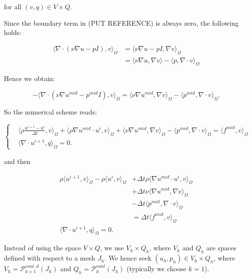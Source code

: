 \documentclass[11pt,a4paper,titlepage]{report}
\begin{document}
for all $(v,q) \in V \times Q$.

Since the boundary term in (PUT REFERENCE) is always zero, the following holds:

\[
\begin{aligned}
\langle \nabla \cdot (\nu \nabla u - pI) ,v \rangle_\Omega & = \langle \nu \nabla u - pI ,\nabla v \rangle_\Omega \\
														& = \langle \nu \nabla u  ,\nabla v \rangle  - \langle p ,\nabla \cdot v \rangle_\Omega										
\end{aligned}
\]

Hence we obtain:

\[
- \langle \nabla \cdot (\nu \nabla u^{mid} - p^{mid}I) ,v \rangle_{\Omega} = \langle \nu \nabla u^{mid}, \nabla v \rangle_\Omega -  \langle p^{mid}, \nabla \cdot v \rangle_\Omega.
\]

So the numerical scheme reads:

\[
\left\{  
\begin{aligned}
& \langle \rho \frac{u^{i+1} - u^i}{\Delta t},v \rangle_\Omega
+ \langle \rho \nabla u^{mid} \cdot u^i  ,v \rangle_\Omega
+ \langle \nu \nabla u^{mid}, \nabla v \rangle_\Omega
- \langle p^{mid} , \nabla \cdot v \rangle_\Omega = \langle f^{mid} ,v \rangle_\Omega \\
& \langle \nabla \cdot u^{i+1},q \rangle_\Omega =  0.
\end{aligned}
\right.
\]

and then

\[
\begin{aligned}
\rho \langle u^{i+1},v \rangle_\Omega - \rho \langle u^i, v \rangle_\Omega & + \Delta t \rho \langle \nabla u^{mid} \cdot u^i  ,v \rangle_\Omega \\
& + \Delta t \nu \langle \nabla u^{mid}, \nabla v \rangle_\Omega \\
& - \Delta t \langle p^{mid} , \nabla \cdot v \rangle_\Omega \\
& = \Delta t \langle f^{mid} ,v \rangle_\Omega \\
\langle \nabla \cdot u^{i+1},q \rangle_\Omega  = 0.
\end{aligned}
\]

Instead of using the space $V \times Q$, we use $V_h \times Q_h$, where $V_h$ and $Q_h$ are spaces defined with respect to a mesh $J_h$. We hence seek $(u_h, p_h) \in V_h \times Q_h$, where $V_h = \mathcal{P}^{cont,d}_{k+1} (J_h)$ and $Q_h = \mathcal{P}^{cont}_{k} (J_h)$ (typically we choose $k=1$). \\
\end{document}
